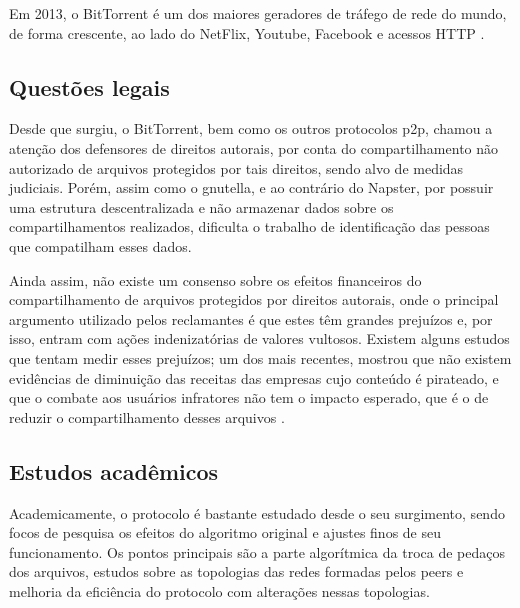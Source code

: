 Em 2013, o BitTorrent é um dos maiores geradores de tráfego de rede do mundo, de forma
crescente, ao lado do NetFlix, Youtube, Facebook e acessos HTTP
\cite{report:internet-usage-2013}.

\subsection*{Questões legais}

Desde que surgiu, o BitTorrent, bem como os outros protocolos \gls*{p2p}, chamou a
atenção dos defensores de direitos autorais, por conta do compartilhamento não
autorizado de arquivos protegidos por tais direitos, sendo alvo de medidas judiciais.
Porém, assim como o \gls*{gnutella}, e ao contrário do Napster, por possuir uma
estrutura descentralizada e não armazenar dados sobre os compartilhamentos realizados,
dificulta o trabalho de identificação das pessoas que compatilham esses dados.

Ainda assim, não existe um consenso sobre os efeitos financeiros do compartilhamento de
arquivos protegidos por direitos autorais, onde o principal argumento utilizado pelos
reclamantes é que estes têm grandes prejuízos e, por isso, entram com ações
indenizatórias de valores vultosos. Existem alguns estudos que tentam medir esses
prejuízos; um dos mais recentes, mostrou que não existem evidências de diminuição das
receitas das empresas cujo conteúdo é pirateado, e que o combate aos usuários
infratores não tem o impacto esperado, que é o de reduzir o compartilhamento desses
arquivos \cite{report:lse-piracy}.

\subsection*{Estudos acadêmicos}


Academicamente, o protocolo é bastante estudado desde o seu surgimento, sendo focos de
pesquisa os efeitos do algoritmo original e ajustes finos de seu funcionamento. Os
pontos principais são a parte algorítmica da troca de pedaços dos arquivos, estudos
sobre as topologias das redes formadas pelos \glspl*{peer} e melhoria da eficiência
do protocolo com alterações nessas topologias.

\afterpage{\clearpage}